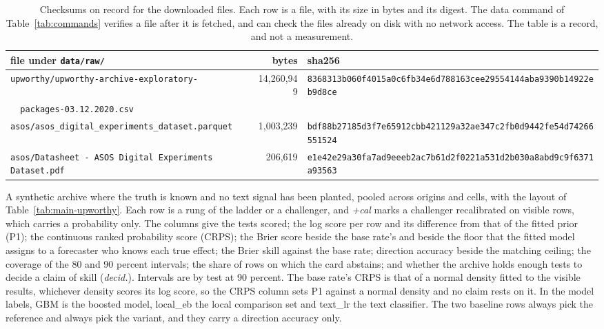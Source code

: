 \begin{table}[t]\centering\scriptsize
\caption{Checksums on record for the downloaded files. Each row is a file, with its size in bytes and its digest. The data command of Table~\ref{tab:commands} verifies a file after it is fetched, and can check the files already on disk with no network access. The table is a record, and not a measurement.}
\label{tab:checksums}
\begin{tabular}{lrl}
\toprule
file under \texttt{data/raw/} & bytes & sha256 \\
\midrule
\texttt{upworthy/upworthy-archive-exploratory-} & 14,260,949 & \texttt{8368313b060f4015a0c6fb34e6d788163cee29554144aba9390b14922eb9d8ce} \\
\texttt{\ \ packages-03.12.2020.csv} & & \\
\texttt{asos/asos\_digital\_experiments\_dataset.parquet} & 1,003,239 & \texttt{bdf88b27185d3f7e65912cbb421129a32ae347c2fb0d9442fe54d74266551524} \\
\texttt{asos/Datasheet - ASOS Digital Experiments Dataset.pdf} & 206,619 & \texttt{e1e42e29a30fa7ad9eeeb2ac7b61d2f0221a531d2b030a8abd9c9f6371a93563} \\
\bottomrule
\end{tabular}
\end{table}

\begin{table}[t]\centering\scriptsize
\caption{A synthetic archive where the truth is known and no text signal has been planted, pooled across origins and cells, with the layout of Table~\ref{tab:main-upworthy}. Each row is a rung of the ladder or a challenger, and \emph{+cal} marks a challenger recalibrated on visible rows, which carries a probability only. The columns give the tests scored; the log score per row and its difference from that of the fitted prior (P1); the continuous ranked probability score (CRPS); the Brier score beside the base rate's and beside the floor that the fitted model assigns to a forecaster who knows each true effect; the Brier skill against the base rate; direction accuracy beside the matching ceiling; the coverage of the 80 and 90 percent intervals; the share of rows on which the card abstains; and whether the archive holds enough tests to decide a claim of skill (\emph{decid.}). Intervals are by test at 90 percent. The base rate's CRPS is that of a normal density fitted to the visible results, whichever density scores its log score, so the CRPS column sets P1 against a normal density and no claim rests on it. In the model labels, GBM is the boosted model, local\_eb the local comparison set and text\_lr the text classifier. The two baseline rows always pick the reference and always pick the variant, and they carry a direction accuracy only.}
\label{tab:main-synthetic}
\resizebox{\textwidth}{!}{}
\end{table}

